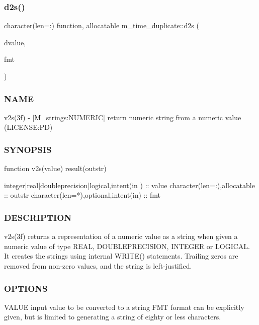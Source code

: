 \subsubsection{\texorpdfstring{d2s()}{d2s()}}
{\footnotesize\ttfamily character(len=\+:) function, allocatable m\+\_\+time\+\_\+duplicate\+::d2s (\begin{DoxyParamCaption}\item[{doubleprecision, intent(in)}]{dvalue,  }\item[{character(len=$\ast$), intent(in), optional}]{fmt }\end{DoxyParamCaption})}



\subsubsection*{N\+A\+ME}

v2s(3f) -\/ \mbox{[}M\+\_\+strings\+:N\+U\+M\+E\+R\+IC\mbox{]} return numeric string from a numeric value (L\+I\+C\+E\+N\+SE\+:PD) 

\subsubsection*{S\+Y\+N\+O\+P\+S\+IS}

\begin{DoxyVerb}   function v2s(value) result(outstr)

    integer|real|doubleprecision|logical,intent(in ) :: value
    character(len=:),allocatable :: outstr
    character(len=*),optional,intent(in) :: fmt
\end{DoxyVerb}


\subsubsection*{D\+E\+S\+C\+R\+I\+P\+T\+I\+ON}

v2s(3f) returns a representation of a numeric value as a string when given a numeric value of type R\+E\+AL, D\+O\+U\+B\+L\+E\+P\+R\+E\+C\+I\+S\+I\+ON, I\+N\+T\+E\+G\+ER or L\+O\+G\+I\+C\+AL. It creates the strings using internal W\+R\+I\+T\+E() statements. Trailing zeros are removed from non-\/zero values, and the string is left-\/justified.

\subsubsection*{O\+P\+T\+I\+O\+NS}

V\+A\+L\+UE input value to be converted to a string F\+MT format can be explicitly given, but is limited to generating a string of eighty or less characters.

